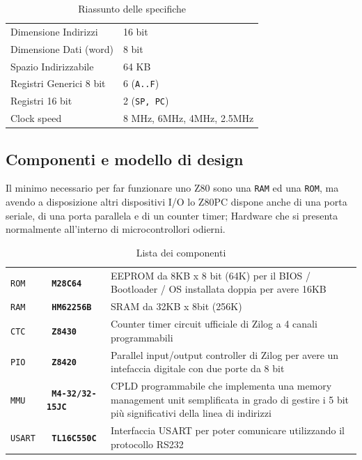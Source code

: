 \documentclass[a4paper, 11pt]{article}
\newcommand{\prj}{Z80\textmu PC\xspace}
\begin{document}
\begin{table}[ht]\centering
\caption{Riassunto delle specifiche}

\begin{tabular}{ l l }
    \toprule
    Dimensione Indirizzi    & 16 bit \\
    Dimensione Dati (word)  & 8 bit \\
    Spazio Indirizzabile    & 64 KB \\
    Registri Generici 8 bit & 6 ({\tt A..F}) \\
    Registri 16 bit         & 2 ({\tt SP, PC}) \\
    Clock speed             & 8 MHz, 6MHz, 4MHz, 2.5MHz \\
    \bottomrule
\end{tabular}
\end{table}

\subsection{Componenti e modello di design}
Il minimo necessario per far funzionare uno Z80 sono una {\tt RAM} ed una
{\tt ROM}, ma avendo a disposizione altri dispositivi I/O lo \prj dispone
anche di una porta seriale, di una porta parallela e di un counter timer;
Hardware che si presenta normalmente all'interno di microcontrollori odierni.

\begin{table}[h!]\centering
\caption{Lista dei componenti}
\begin{tabular}{ >{\tt}p{} >{\tt\bfseries}p{} >{\footnotesize}p{} }
    \toprule
    ROM & M28C64    & EEPROM da 8KB x 8 bit (64K) per il BIOS / Bootloader /
                      OS installata doppia per avere 16KB \\
    RAM & HM62256B  & SRAM da 32KB x 8bit (256K) \\
    CTC & Z8430     & Counter timer circuit ufficiale di Zilog a 4 canali
                      programmabili \\
    PIO & Z8420     & Parallel input/output controller di Zilog per avere un
                      intefaccia digitale con due porte da 8 bit \\
    MMU & M4-32/32-15JC & CPLD programmabile che implementa una memory 
                          management unit semplificata in grado di gestire i 
                          5 bit pi\`u significativi della linea di indirizzi \\
    USART & TL16C550C & Interfaccia USART per poter comunicare utilizzando il
                        protocollo RS232 \\
    \bottomrule
\end{tabular}
\end{table}
\end{document}
